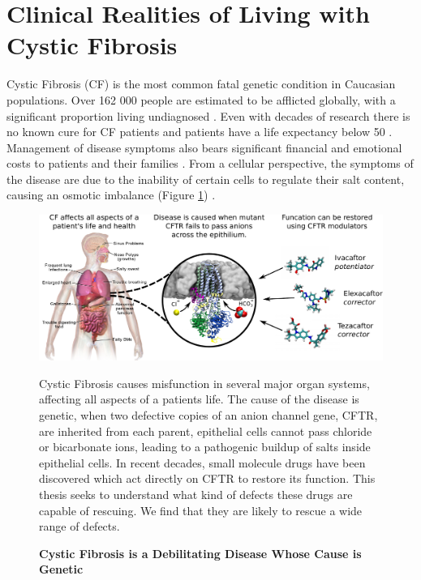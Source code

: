 

\section{Clinical Realities of Living with Cystic Fibrosis}
Cystic Fibrosis (CF) is the most common fatal genetic condition in Caucasian populations. Over 162 000 people are estimated to be afflicted globally, with a significant proportion living undiagnosed \cite{hammoudeh2021,guo2022}. Even with decades of research there is no known cure for CF patients and patients have a life expectancy below 50 \cite{mcbennett2022}. Management of disease symptoms also bears significant financial and emotional costs to patients and their families \cite{vangool2013, page2022}. From a cellular perspective, the symptoms of the disease are due to the inability of certain cells to regulate their salt content, causing an osmotic imbalance (Figure \ref{CF_summary}) \cite{reddy2013}. 

\begin{figure}
	\label{CF_summary}
	\begin{center}
	\includegraphics[width=1\textwidth]{figures/cf_summary_fig.pdf}
	\end{center}
	\captionsetup{singlelinecheck = false, justification=raggedright}
	\caption[Cystic Fibrosis is a Debilitating Disease Whose Cause is Genetic] {\textbf{Cystic Fibrosis is a Debilitating Disease Whose Cause is Genetic}}{Cystic Fibrosis causes misfunction in several major organ systems, affecting all aspects of a patients life. The cause of the disease is genetic, when two defective copies of an anion channel gene, CFTR, are inherited from each parent, epithelial cells cannot pass chloride or bicarbonate ions, leading to a pathogenic buildup of salts inside epithelial cells. In recent decades, small molecule drugs have been discovered which act directly on CFTR to restore its function. This thesis seeks to understand what kind of defects these drugs are capable of rescuing. We find that they are likely to rescue a wide range of defects.} 
\end{figure}

